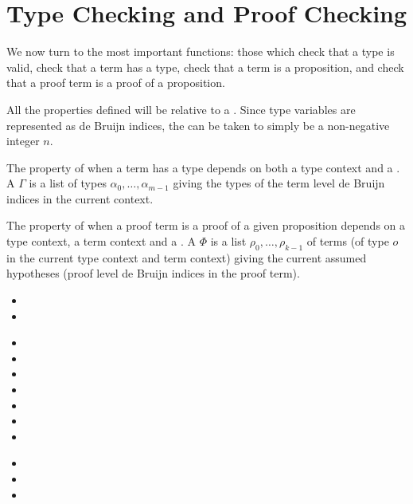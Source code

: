\section{Type Checking and Proof Checking}

We now turn to the most important functions: those which check that a type
is valid, check that a term has a type, check that a term is a proposition,
and check that a proof term is a proof of a proposition.

All the properties defined will be relative to a
{}.
Since type variables are represented
as de Bruijn indices, the {}
can be taken to simply be a non-negative integer $n$.

The property of when a term has a type
depends on both a type context and a {}.
A {} $\Gamma$ is a list of types
$\alpha_0,\ldots,\alpha_{m-1}$
giving the types of the term level de Bruijn indices
in the current context.

The property of when a proof term is a proof of a given
proposition depends on a type context, a term context
and a {}.
A {} $\Phi$ is a list
$\rho_0,\ldots,\rho_{k-1}$
of terms (of type $o$ in the current type context
and term context)
giving the current assumed hypotheses
(proof level de Bruijn indices in the proof term).

\begin{itemize}
\item {}
\item {}
\end{itemize}

\begin{itemize}
\item {}
\item {}
\item {}
\item {}
\item {}
\item {}
\item {}
\end{itemize}

\begin{itemize}
\item {}
\item {}
\item {}
\end{itemize}
